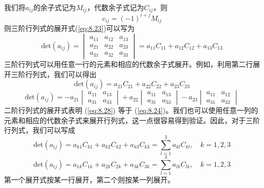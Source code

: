     我们将$a_{ij}$的余子式记为$M_{ij}$，代数余子式记为$C_{ij}$，则
    \begin{equation}
        c_{ij} = \left(-1\right)^{i+j}M_{ij}
        \label{eq:8.25}
    \end{equation}
    则三阶行列式的展开式(\ref{eq:8.23})可以写为
    \begin{equation}
        \mathrm{det}\left(a_{ij}\right) = \begin{vmatrix}
            a_{11} & a_{12} & a_{13} \\
            a_{21} & a_{22} & a_{23} \\
            a_{31} & a_{32} & a_{33}
        \end{vmatrix} = a_{11}C_{11} + a_{12}C_{12} + a_{13}C_{13}
        \label{eq:8.26}
    \end{equation}
    三阶行列式可以用任意一行的元素和相应的代数余子式展开。例如，利用第二行展开三阶行列式，我们可以得出
    \begin{equation}
        \mathrm{det}\left(a_{ij}\right) = a_{21}C_{21} + a_{22}C_{22} + a_{23}C_{23}
        \label{eq:8.27}
    \end{equation}
    \begin{equation}
        \mathrm{det}\left(a_{ij}\right) = -a_{21}\begin{vmatrix}
            a_{11} & a_{13} \\
            a_{31} & a_{33}
        \end{vmatrix} + a_{22}\begin{vmatrix}
            a_{11} & a_{13} \\
            a_{31} & a_{33}
        \end{vmatrix} - a_{23}\begin{vmatrix}
            a_{11} & a_{12} \\
            a_{31} & a_{32}
        \end{vmatrix}
        \label{eq:8.28}
    \end{equation}
    二阶行列式的展开式表明 (\ref{eq:8.28}) 等于 (\ref{eq:8.24})。我们也可以使用任意一列的元素和相应的代数余子式来展开行列式，这一点很容易得到验证。因此，对于三阶行列式，我们可以写成
    \begin{equation*}
        \mathrm{det}\left(a_{ij}\right) = a_{k1}C_{k1} + a_{k2}C_{k2} + a_{k3}C_{k3} = \sum_{l=1}^{3} a_{kl}C_{kl}, \quad k = 1,2,3
    \end{equation*}
    \begin{equation*}
        \mathrm{det}\left(a_{ij}\right) = a_{1k}C_{1k} + a_{2k}C_{2k} + a_{3k}C_{3k} = \sum_{l=1}^{3} a_{lk}C_{lk}, \quad k = 1,2,3
    \end{equation*}
    第一个展开式按某一行展开，第二个则按某一列展开。

